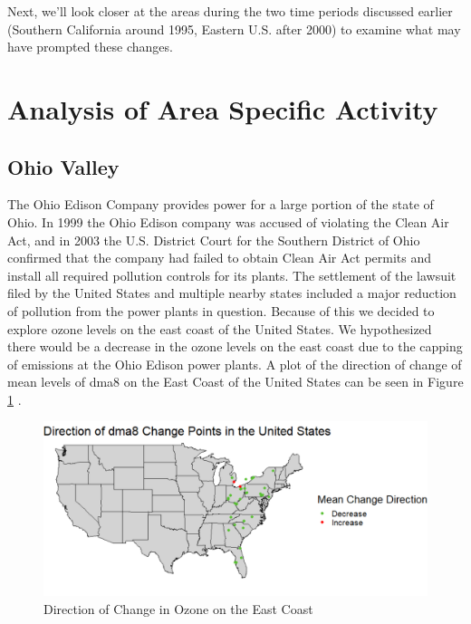 \documentclass[11pt, oneside]{article}
\theoremstyle{definition}
\begin{document}
Next, we'll look closer at the areas during the two time periods discussed earlier (Southern California around 1995, Eastern U.S. after 2000) to examine what may have prompted these changes.

\section{Analysis of Area Specific Activity}
\subsection{Ohio Valley}
The Ohio Edison Company provides power for a large portion of the state of Ohio. In 1999 the Ohio Edison company was accused of violating the Clean Air Act, and in 2003 the U.S. District Court for the Southern District of Ohio confirmed that the company had failed to obtain Clean Air Act permits and install all required pollution controls for its plants. The settlement of the lawsuit filed by the United States and multiple nearby states included a major reduction of pollution from the power plants in question. Because of this we decided to explore ozone levels on the east coast of the United States. We hypothesized there would be a decrease in the ozone levels on the east coast due to the capping of emissions at the Ohio Edison power plants. A plot of the direction of change of mean levels of dma8 on the East Coast of the United States can be seen in Figure \ref{east_coast_direction} . 

\begin{figure}[H]
    \centering
    \includegraphics[width=0.8\linewidth]{plots/east_coast_direction.png}
    \caption{Direction of Change in Ozone on the East Coast}
    \label{east_coast_direction}
\end{figure}
\end{document}
